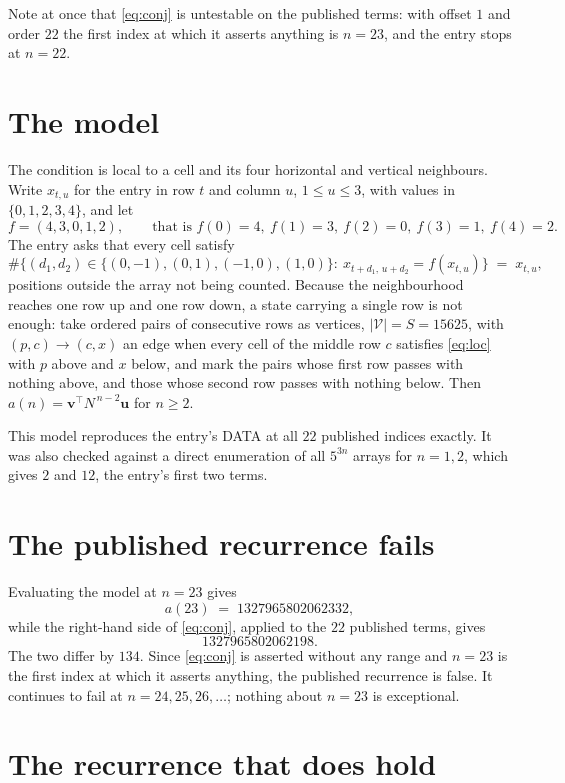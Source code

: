 \documentclass[11pt,a4paper]{article}
\theoremstyle{plain}
\theoremstyle{definition}
\begin{document}
Note at once that \eqref{eq:conj} is untestable on the published terms: with offset $1$ and
order $22$ the first index at which it asserts anything is $n=23$, and the entry stops at
$n=22$.

\section{The model}

The condition is local to a cell and its four horizontal and vertical neighbours. Write
$x_{t,u}$ for the entry in row $t$ and column $u$, $1\le u\le3$, with values in
$\{0,1,2,3,4\}$, and let
\[
f=(4,3,0,1,2),\qquad\text{that is } f(0)=4,\ f(1)=3,\ f(2)=0,\ f(3)=1,\ f(4)=2 .
\]
The entry asks that every cell satisfy
\begin{equation}\label{eq:loc}
\#\bigl\{(d_1,d_2)\in\{(0,-1),(0,1),(-1,0),(1,0)\}:\ x_{t+d_1,\,u+d_2}=f(x_{t,u})\bigr\}
\;=\;x_{t,u},
\end{equation}
positions outside the array not being counted. Because the neighbourhood reaches one row up
and one row down, a state carrying a single row is not enough: take ordered pairs of
consecutive rows as vertices, $|\mathcal V|=S=15625$, with $(p,c)\to(c,x)$ an edge when every
cell of the middle row $c$ satisfies \eqref{eq:loc} with $p$ above and $x$ below, and mark
the pairs whose first row passes with nothing above, and those whose second row passes with
nothing below. Then $a(n)=\mathbf{v}^{\!\top}N^{\,n-2}\mathbf{u}$ for $n\ge2$.

This model reproduces the entry's DATA at all $22$ published indices exactly. It was also
checked against a direct enumeration of all $5^{3n}$ arrays for $n=1,2$, which gives $2$ and
$12$, the entry's first two terms.

\section{The published recurrence fails}

Evaluating the model at $n=23$ gives
\[
a(23)\;=\;1327965802062332,
\]
while the right-hand side of \eqref{eq:conj}, applied to the $22$ published terms, gives
\[
1327965802062198.
\]
The two differ by $134$. Since \eqref{eq:conj} is asserted without any range and
$n=23$ is the first index at which it asserts anything, the published recurrence is false.
It continues to fail at $n=24,25,26,\dots$; nothing about $n=23$ is exceptional.

\section{The recurrence that does hold}
\end{document}
